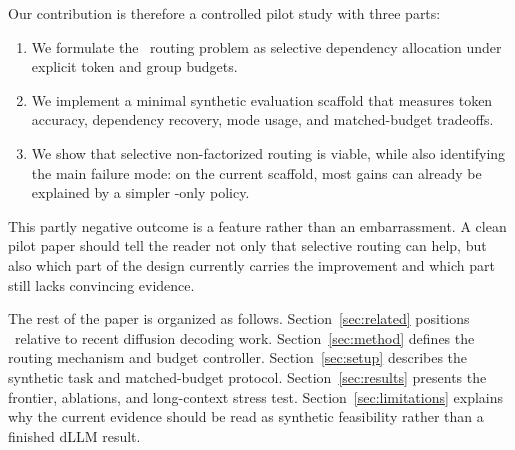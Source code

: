 Our contribution is therefore a controlled pilot study with three parts:
\begin{enumerate}
\item We formulate the \method\ routing problem as selective dependency allocation under explicit token and group budgets.
\item We implement a minimal synthetic evaluation scaffold that measures token accuracy, dependency recovery, mode usage, and matched-budget tradeoffs.
\item We show that selective non-factorized routing is viable, while also identifying the main failure mode: on the current scaffold, most gains can already be explained by a simpler \coupled-only policy.
\end{enumerate}

This partly negative outcome is a feature rather than an embarrassment. A clean pilot paper should tell the reader not only that selective routing can help, but also which part of the design currently carries the improvement and which part still lacks convincing evidence.

The rest of the paper is organized as follows. Section~\ref{sec:related} positions \method\ relative to recent diffusion decoding work. Section~\ref{sec:method} defines the routing mechanism and budget controller. Section~\ref{sec:setup} describes the synthetic task and matched-budget protocol. Section~\ref{sec:results} presents the frontier, ablations, and long-context stress test. Section~\ref{sec:limitations} explains why the current evidence should be read as synthetic feasibility rather than a finished dLLM result.
